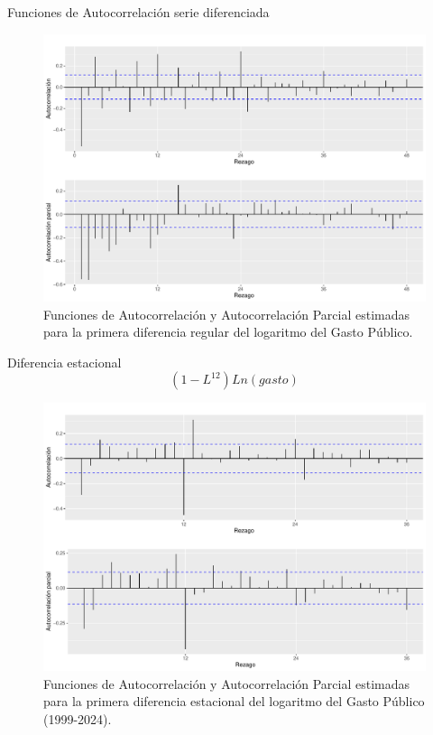 \documentclass[
  ignorenonframetext,
]{beamer}
\begin{document}
\begin{frame}{Funciones de Autocorrelación serie diferenciada}
\protect\hypertarget{funciones-de-autocorrelaciuxf3n-serie-diferenciada}{}
\begin{figure}[H]

{\centering \includegraphics[width=0.85\linewidth]{presentacion_files/figure-beamer/unnamed-chunk-3-1} 

}

\caption{\label{fac_facp_diff} Funciones de Autocorrelación y Autocorrelación Parcial estimadas para la primera diferencia regular del logaritmo del Gasto Público.}\label{fig:unnamed-chunk-3}
\end{figure}
\end{frame}

\begin{frame}{Diferencia estacional}
\protect\hypertarget{diferencia-estacional}{}
\[(1-L^{12}) Ln(gasto)\]

\begin{figure}[H]

{\centering \includegraphics[width=0.7\linewidth]{presentacion_files/figure-beamer/unnamed-chunk-4-1} 

}

\caption{\label{fac_facp_estac} Funciones de Autocorrelación y Autocorrelación Parcial estimadas para la primera diferencia estacional del logaritmo del Gasto Público (1999-2024).}\label{fig:unnamed-chunk-4}
\end{figure}
\end{frame}
\end{document}
